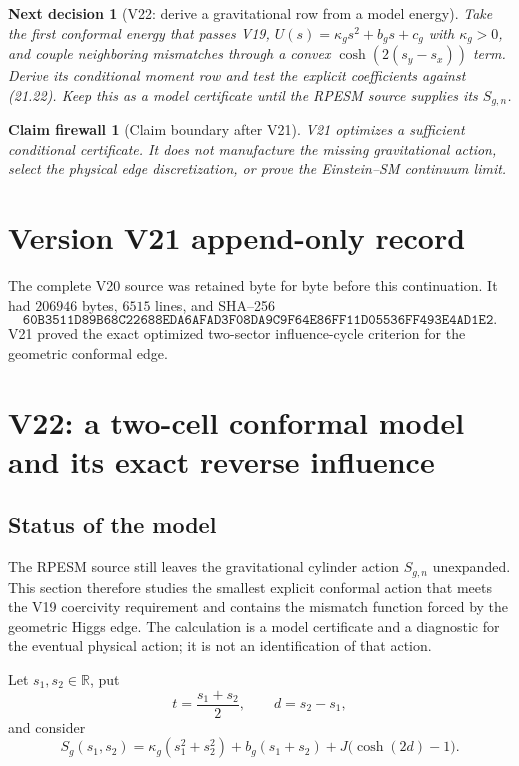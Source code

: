 \documentclass[11pt]{article}
\newtheorem{firewall}[theorem]{Claim firewall}
\newtheorem{decision}[theorem]{Next decision}
\theoremstyle{remark}
\begin{document}
\begin{decision}[V22: derive a gravitational row from a model energy]
\label{dec:v17v21-next}
Take the first conformal energy that passes V19,
\(U(s)=\kappa_gs^2+b_gs+c_g\) with \(\kappa_g>0\), and couple
neighboring mismatches through a convex
\(\cosh(2(s_y-s_x))\) term.  Derive its conditional moment row and
test the explicit coefficients against (21.22).  Keep this as a
model certificate until the RPESM source supplies its \(S_{g,n}\).
\end{decision}

\begin{firewall}[Claim boundary after V21]
\label{fire:v17v21}
V21 optimizes a sufficient conditional certificate.  It does not
manufacture the missing gravitational action, select the physical
edge discretization, or prove the Einstein--SM continuum limit.
\end{firewall}

\section*{Version V21 append-only record}
The complete V20 source was retained byte for byte before this
continuation.  It had \(206946\) bytes, \(6515\) lines, and SHA--256
\[
 \texttt{60B3511D89B68C22688EDA6AFAD3F08DA9C9F64E86FF11D05536FF493E4AD1E2}.
\]
V21 proved the exact optimized two-sector influence-cycle
criterion for the geometric conformal edge.


\section{V22: a two-cell conformal model and its exact reverse influence}
\label{sec:v17v22}

\subsection{Status of the model}

The RPESM source still leaves the gravitational cylinder action
\(S_{g,n}\) unexpanded.  This section therefore studies the smallest
explicit conformal action that meets the V19 coercivity requirement and
contains the mismatch function forced by the geometric Higgs edge.  The
calculation is a model certificate and a diagnostic for the eventual
physical action; it is not an identification of that action.

Let \(s_1,s_2\in\mathbb R\), put
\[
 t=\frac{s_1+s_2}{2},\qquad d=s_2-s_1,              \tag{22.1}
\]
and consider
\[
 S_g(s_1,s_2)
 =\kappa_g(s_1^2+s_2^2)+b_g(s_1+s_2)
 +J\bigl(\cosh(2d)-1\bigr).                        \tag{22.2}
\]
\end{document}
